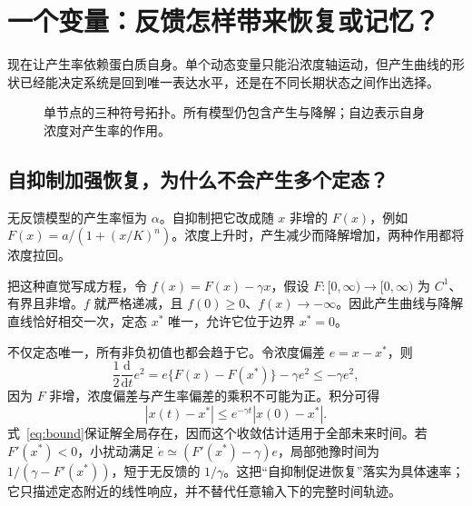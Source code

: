 \documentclass[11pt,a4paper,UTF8,fontset=fandol]{ctexart}
\newcommand{\dd}{\mathrm d}\newcommand{\R}{\mathbb R}\newcommand{\ssv}{\mathrm{ss}}
\begin{document}
\section{一个变量：反馈怎样带来恢复或记忆？}
现在让产生率依赖蛋白质自身。单个动态变量只能沿浓度轴运动，但产生曲线的形状已经能决定系统是回到唯一表达水平，还是在不同长期状态之间作出选择。

\begin{figure}[H]\centering
{}
\caption{单节点的三种符号拓扑。所有模型仍包含产生与降解；自边表示自身浓度对产生率的作用。}
\end{figure}
\subsection{自抑制加强恢复，为什么不会产生多个定态？}
无反馈模型的产生率恒为 $\alpha$。自抑制把它改成随 $x$ 非增的 $F(x)$，例如 $F(x)=a/(1+(x/K)^n)$。浓度上升时，产生减少而降解增加，两种作用都将浓度拉回。

把这种直觉写成方程，令 $f(x)=F(x)-\gamma x$，假设 $F:[0,\infty)\to[0,\infty)$ 为 $C^1$、有界且非增。$f$ 就严格递减，且 $f(0)\geq0$、$f(x)\to-\infty$。因此产生曲线与降解直线恰好相交一次，定态 $x^*$ 唯一，允许它位于边界 $x^*=0$。

不仅定态唯一，所有非负初值也都会趋于它。令浓度偏差 $e=x-x^*$，则
\[
\frac12\frac{\dd}{\dd t}e^2=e\{F(x)-F(x^*)\}-\gamma e^2\leq-\gamma e^2,
\]
因为 $F$ 非增，浓度偏差与产生率偏差的乘积不可能为正。积分可得
\[
|x(t)-x^*|\leq e^{-\gamma t}|x(0)-x^*|.
\]
式~\eqref{eq:bound}保证解全局存在，因而这个收敛估计适用于全部未来时间。若 $F'(x^*)<0$，小扰动满足 $\dot e\simeq(F'(x^*)-\gamma)e$，局部弛豫时间为 $1/(\gamma-F'(x^*))$，短于无反馈的 $1/\gamma$。这把“自抑制促进恢复”落实为具体速率；它只描述定态附近的线性响应，并不替代任意输入下的完整时间轨迹。
\end{document}
